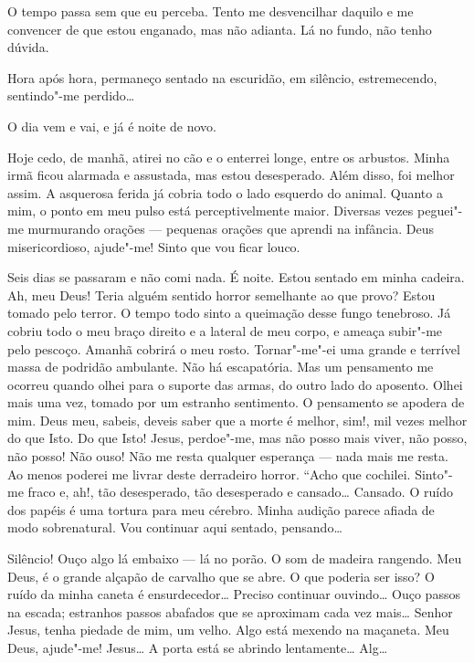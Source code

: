 O tempo passa sem que eu perceba. Tento me desvencilhar daquilo e me convencer de que estou enganado, mas não adianta.
Lá no fundo, não tenho dúvida.

Hora após hora, permaneço sentado na escuridão, em silêncio, estremecendo, sentindo"-me perdido\ldots{}

O dia vem e vai, e já é noite de novo.

Hoje cedo, de manhã, atirei no cão e o enterrei longe, entre os arbustos. Minha irmã ficou alarmada e assustada, mas
estou desesperado. Além disso, foi melhor assim. A asquerosa ferida já cobria todo o lado esquerdo do animal. Quanto a
mim, o ponto em meu pulso está perceptivelmente maior. Diversas vezes peguei"-me murmurando orações --- pequenas orações
que aprendi na infância. Deus misericordioso, ajude"-me! Sinto que vou ficar louco.

Seis dias se passaram e não comi nada. É noite. Estou sentado em minha cadeira. Ah, meu Deus! Teria alguém sentido
horror semelhante ao que provo? Estou tomado pelo terror. O tempo todo sinto a queimação desse fungo tenebroso. Já
cobriu todo o meu braço direito e a lateral de meu corpo, e ameaça subir"-me pelo pescoço. Amanhã cobrirá o meu rosto.
Tornar"-me"-ei uma grande e terrível massa de podridão ambulante. Não há escapatória. Mas um pensamento me ocorreu quando
olhei para o suporte das armas, do outro lado do aposento. Olhei mais uma vez, tomado por um estranho sentimento. O
pensamento se apodera de mim. Deus meu, sabeis, deveis saber que a morte é melhor, sim!, mil vezes melhor do que Isto.
Do que Isto! Jesus, perdoe"-me, mas não posso mais viver, não posso, não posso! Não ouso! Não me resta qualquer
esperança --- nada mais me resta. Ao menos poderei me livrar deste derradeiro horror. “Acho que cochilei. Sinto"-me fraco
e, ah!, tão desesperado, tão desesperado e cansado\ldots{} Cansado. O ruído dos papéis é uma tortura para meu cérebro. Minha
audição parece afiada de modo sobrenatural. Vou continuar aqui sentado, pensando\ldots{}

Silêncio! Ouço algo lá embaixo ---
lá no porão. O som de madeira rangendo. Meu Deus, é o grande alçapão de carvalho que se abre. O que poderia ser isso? O
ruído da minha caneta é ensurdecedor\ldots{} Preciso continuar ouvindo\ldots{} Ouço passos na escada; estranhos passos abafados
que se aproximam cada vez mais\ldots{} Senhor Jesus, tenha piedade de mim, um velho. Algo está mexendo na maçaneta. Meu
Deus, ajude"-me! Jesus\ldots{} A porta está se abrindo lentamente\ldots{} Alg\ldots{}


